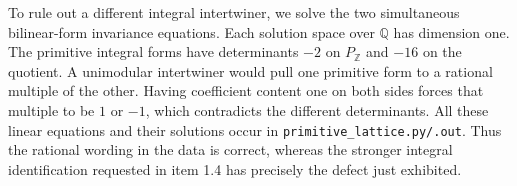 \item To rule out a different integral intertwiner, we solve the two
simultaneous bilinear-form invariance equations.  Each solution space
over $\mathbb Q$ has dimension one.  The primitive integral forms have
determinants $-2$ on $P_{\mathbb Z}$ and $-16$ on the quotient.
A unimodular intertwiner would pull one primitive form to a rational
multiple of the other.  Having coefficient content one on both sides
forces that multiple to be $1$ or $-1$, which contradicts the different
determinants.  All these linear equations and their solutions occur in
\texttt{primitive\_lattice.py/.out}.  Thus the rational wording in the
data is correct, whereas the stronger integral identification requested
in item 1.4 has precisely the defect just exhibited.
